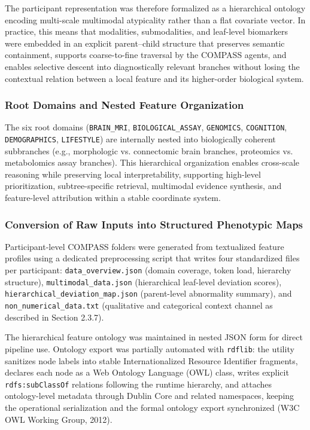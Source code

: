 \documentclass[11pt,a4paper,twoside]{article}
\begin{document}
The participant representation was therefore formalized as a hierarchical ontology encoding multi-scale multimodal atypicality rather than a flat covariate vector. In practice, this means that modalities, submodalities, and leaf-level biomarkers were embedded in an explicit parent--child structure that preserves semantic containment, supports coarse-to-fine traversal by the COMPASS agents, and enables selective descent into diagnostically relevant branches without losing the contextual relation between a local feature and its higher-order biological system.

\subsubsection{Root Domains and Nested Feature Organization}
The six root domains (\texttt{BRAIN\_{\allowbreak}MRI}, \texttt{BIOLOGICAL\_{\allowbreak}ASSAY}, \texttt{GENOMICS}, \texttt{COGNITION}, \texttt{DEMOGRAPHICS}, \texttt{LIFESTYLE}) are internally nested into biologically coherent subbranches (e.g., morphologic vs. connectomic brain branches, proteomics vs. metabolomics assay branches). This hierarchical organization enables cross-scale reasoning while preserving local interpretability, supporting high-level prioritization, subtree-specific retrieval, multimodal evidence synthesis, and feature-level attribution within a stable coordinate system.

\subsubsection{Conversion of Raw Inputs into Structured Phenotypic Maps}
Participant-level COMPASS folders were generated from textualized feature profiles using a dedicated preprocessing script that writes four standardized files per participant: \texttt{data\_{\allowbreak}overview.{\allowbreak}json} (domain coverage, token load, hierarchy structure), \texttt{multimodal\_{\allowbreak}data.{\allowbreak}json} (hierarchical leaf-level deviation scores), \texttt{hierarchical\_{\allowbreak}deviation\_{\allowbreak}map.{\allowbreak}json} (parent-level abnormality summary), and \texttt{non\_{\allowbreak}numerical\_{\allowbreak}data.{\allowbreak}txt} (qualitative and categorical context channel as described in Section 2.3.7).

The hierarchical feature ontology was maintained in nested JSON form for direct pipeline use. Ontology export was partially automated with \texttt{rdflib}: the utility sanitizes node labels into stable Internationalized Resource Identifier fragments, declares each node as a Web Ontology Language (OWL) class, writes explicit \texttt{rdfs:{\allowbreak}subClassOf} relations following the runtime hierarchy, and attaches ontology-level metadata through Dublin Core and related namespaces, keeping the operational serialization and the formal ontology export synchronized (W3C OWL Working Group, 2012).
\end{document}
